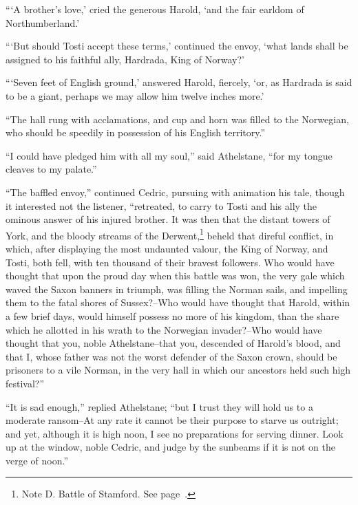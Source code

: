 ```A brother's love,' cried the generous Harold, `and the fair earldom
of Northumberland.'

```But should Tosti accept these terms,' continued the envoy, `what
lands shall be assigned to his faithful ally, Hardrada, King of Norway?'

```Seven feet of English ground,' answered Harold, fiercely, `or, as
Hardrada is said to be a giant, perhaps we may allow him twelve inches
more.'

``The hall rung with acclamations, and cup and horn was filled to the
Norwegian, who should be speedily in possession of his English
territory.''

``I could have pledged him with all my soul,'' said Athelstane, ``for my
tongue cleaves to my palate.''

``The baffled envoy,'' continued Cedric, pursuing with animation his
tale, though it interested not the listener, ``retreated, to carry to
Tosti and his ally the ominous answer of his injured brother. It was
then that the distant towers of York, and the bloody streams of the
Derwent,\footnote{Note D. Battle of Stamford. See page~\pageref{noteCXXI}.}
beheld that direful conflict, in which, after
displaying the most undaunted valour, the King of Norway, and Tosti,
both fell, with ten thousand of their bravest followers. Who would have
thought that upon the proud day when this battle was won, the very gale
which waved the Saxon banners in triumph, was filling the Norman sails,
and impelling them to the fatal shores of Sussex?--Who would have
thought that Harold, within a few brief days, would himself possess no
more of his kingdom, than the share which he allotted in his wrath to
the Norwegian invader?--Who would have thought that you, noble
Athelstane--that you, descended of Harold's blood, and that I, whose
father was not the worst defender of the Saxon crown, should be
prisoners to a vile Norman, in the very hall in which our ancestors held
such high festival?''

``It is sad enough,'' replied Athelstane; ``but I trust they will hold
us to a moderate ransom--At any rate it cannot be their purpose to
starve us outright; and yet, although it is high noon, I see no
preparations for serving dinner. Look up at the window, noble Cedric,
and judge by the sunbeams if it is not on the verge of noon.''

